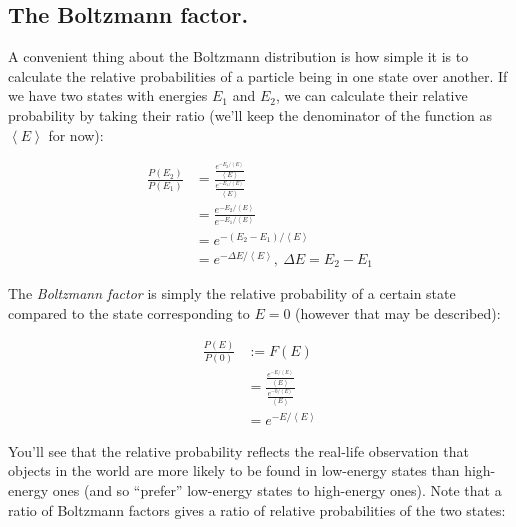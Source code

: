 \documentclass[letterpaper,12pt]{report}
\begin{document}
\subsection{The Boltzmann factor.}

A convenient thing about the Boltzmann distribution is how simple it is to calculate
the relative probabilities of a particle being in one state over another.
If we have two states with energies \(E_1\) and \(E_2\), we can calculate their
relative probability by taking their ratio (we'll keep the denominator
of the function as \(\left<E\right>\) for now):

\[
\begin{split}
  \frac{P(E_2)}{P(E_1)} &= \frac{\frac{e^{-E_2/\left<E\right>}}{\left<E\right>}}{\frac{e^{-E_1/\left<E\right>}}{\left<E\right>}} \\
    &= \frac{e^{-E_2/\left<E\right>}}{e^{-E_1/\left<E\right>}} \\
    &= e^{-(E_2-E_1)/\left<E\right>} \\
    &= e^{-\Delta E/\left<E\right>}, \ \Delta E = E_2 - E_1
\end{split}
\]








The \emph{Boltzmann factor} is simply the relative probability
of a certain state compared to the state corresponding to \(E = 0\)
(however that may be described):

\[
\begin{split}
  \frac{P(E)}{P(0)} &:= F(E) \\
  &= \frac{\frac{e^{-E/\left<E\right>}}{\left<E\right>}}{\frac{e^{-0/\left<E\right>}}{\left<E\right>}} \\
    &= e^{-E/\left<E\right>}
\end{split}
\]

You'll see that the relative probability reflects the real-life observation that
objects in the world are more likely to be found in low-energy states than high-energy
ones (and so ``prefer'' low-energy states to high-energy ones). Note that a ratio
of Boltzmann factors gives a ratio of relative probabilities of the two states:
\end{document}
